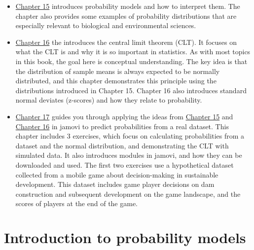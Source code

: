 \documentclass[
  openany]{scrbook}
\begin{document}
\begin{itemize}
\item
  \protect\hyperlink{Chapter_15}{Chapter 15} introduces probability models and how to interpret them.
  The chapter also provides some examples of probability distributions that are especially relevant to biological and environmental sciences.
\item
  \protect\hyperlink{Chapter_16}{Chapter 16} the introduces the central limit theorem (CLT).
  It focuses on what the CLT is and why it is so important in statistics.
  As with most topics in this book, the goal here is conceptual understanding.
  The key idea is that the distribution of sample means is always expected to be normally distributed, and this chapter demonstrates this principle using the distributions introduced in Chapter 15.
  Chapter 16 also introduces standard normal deviates (z-scores) and how they relate to probability.
\item
  \protect\hyperlink{Chapter_17}{Chapter 17} guides you through applying the ideas from \protect\hyperlink{Chapter_15}{Chapter 15} and \protect\hyperlink{Chapter_16}{Chapter 16} in jamovi to predict probabilities from a real dataset.
  This chapter includes 3 exercises, which focus on calculating probabilities from a dataset and the normal distribution, and demonstrating the CLT with simulated data.
  It also introduces modules in jamovi, and how they can be downloaded and used.
  The first two exercises use a hypothetical dataset collected from a mobile game about decision-making in sustainable development.
  This dataset includes game player decisions on dam construction and subsequent development on the game landscape, and the scores of players at the end of the game.
\end{itemize}

\hypertarget{Chapter_15}{%
\chapter{Introduction to probability models}\label{Chapter_15}}
\end{document}
